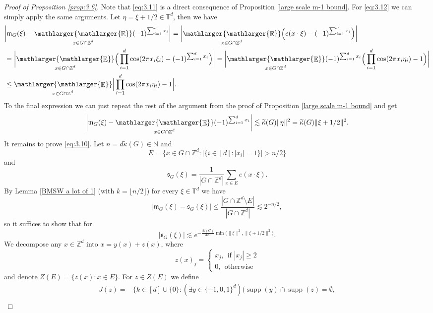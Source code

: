 \documentclass[a4paper,oneside, reqno]{amsart}
\numberwithin{equation}{section}
\theoremstyle{definition}%
\theoremstyle{definition}
\theoremstyle{definition}%
\theoremstyle{definition}
\newcommand{\E}{\mathop{\mathbb{E}}}
\newcommand{\Z}{\mathbb{Z}}
\newcommand{\N}{\mathbb{N}}
\newcommand{\T}{\mathbb{T}}
\DeclareMathOperator{\supp}{supp}
\newcommand{\se}[1]{\underset{_{\substack{#1}}}{\mathlarger{\mathlarger{\E}}}}
\begin{document}
\begin{proof}[Proof of Proposition \ref{prop:3.6}]
Note that \eqref{eq:3.11} is a direct consequence of 
Proposition \ref{large scale m-1 bound}. For \eqref{eq:3.12} we can simply apply the same arguments. Let $\eta=\xi+1/2 \in \T^d$, then we have
\begin{align*}
    &\bigg|\mathfrak{m}_G(\xi)-\se{x \in G \cap \Z^d} (-1)^{\sum_{i=1}^d x_i}\bigg| = \bigg| \se{x \in G \cap \Z^d}\Big( e(x \cdot \xi)- (-1)^{\sum_{i=1}^d x_i} \Big) \bigg| \\
    &=\bigg| \se{x \in G \cap \Z^d}\Big( \prod_{i=1}^d \cos(2 \pi x_i \xi_i)- (-1)^{\sum_{i=1}^d x_i} \Big) \bigg|=\bigg| \se{x \in G \cap \Z^d}(-1)^{\sum_{i=1}^d x_i}\Big( \prod_{i=1}^d \cos(2 \pi x_i \eta_i)- 1 \Big)  \bigg| \\
    &\le \se{x \in G \cap \Z^d} \Big| \prod_{i=1}^d \cos(2 \pi x_i \eta_i)- 1  \Big|.
\end{align*}
To the final expression we can just repeat the rest of the argument from the proof of Proposition \ref{large scale m-1 bound} and get
\[
\bigg|\mathfrak{m}_G(\xi)-\se{x \in G \cap \Z^d} (-1)^{\sum_{i=1}^d x_i}\bigg| \lesssim \widetilde{\kappa}(G) \| \eta \|^2 = \widetilde{\kappa}(G) \| \xi+1/2 \|^2.
\]
It remains to prove \eqref{eq:3.10}. Let $n=d \widetilde{\kappa}(G) \in \N$ and 
\[
E= \Big\{ x \in G \cap \Z^d: |\{ i \in [d]: |x_i|=1 \}| >n/2 \Big\}
\]
and
\[
\mathfrak{s}_{G}(\xi)= \frac{1}{|G \cap \Z^d |} \sum_{x \in E} e(x \cdot \xi).
\]
By Lemma \ref{BMSW a lot of 1} (with $k=\lfloor n/2 \rfloor$) for every $\xi \in \T^d$ we have
\begin{equation} \label{eq: comp with sG}
    |\mathfrak{m}_G(\xi)- \mathfrak{s}_{G}(\xi)| \le \frac{|G \cap \Z^d \setminus E|}{| G \cap \Z^d|} \lesssim 2^{-n/2},
\end{equation}
so it suffices to show that for
\begin{equation} \label{eq: sG bound}
    |\mathfrak{s}_{G}(\xi)| \lesssim e^{- \frac{c\widetilde{\kappa}(G)}{320} \min\big(\|\xi\|^2, \| \xi +1/2\|^2 \big)}.
\end{equation}
We decompose any $x \in \Z^d$ into $x=y(x)+z(x)$, where
    \[
z(x)_j= \begin{cases}
    x_j, \ \ \text{if $|x_j| \geq 2$} \\
    0, \ \ \text{otherwise}
\end{cases}
\]
and denote $Z(E)=\{z(x): x \in E \}$.
For $z \in Z(E)$ we define 
\begin{align*}
    J(z)= &\Big\{ k \in [d] \cup \{0 \}: (\exists y \in \{-1,0,1\}^d) \Big( \supp(y) \cap \supp(z)= \emptyset,  \\

\end{align*}
\end{proof}
\end{document}
